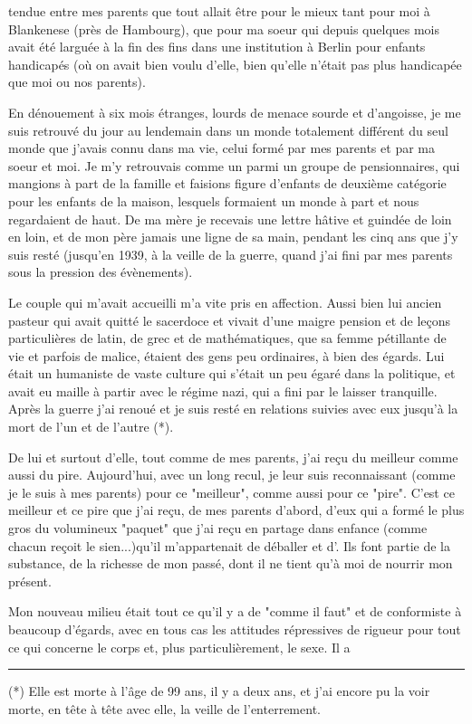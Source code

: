 

tendue entre mes parents que tout allait être pour le mieux tant pour moi à Blankenese (près de Hambourg), que pour ma soeur qui depuis quelques mois avait été larguée à la fin des fins dans une institution à Berlin pour enfants handicapés (où on avait bien voulu d'elle, bien qu'elle n'était pas plus handicapée que moi ou nos parents).

En dénouement à six mois étranges, lourds de menace sourde et d'angoisse, je me suis retrouvé du jour au lendemain dans un monde totalement différent du seul monde que j'avais connu dans ma vie, celui formé par mes parents et par ma soeur et moi. Je m'y retrouvais comme un parmi un groupe de pensionnaires, qui mangions à part de la famille et faisions figure d'enfants de deuxième catégorie pour les enfants de la maison, lesquels formaient un monde à part et nous regardaient de haut. De ma mère je recevais une lettre hâtive et guindée de loin en loin, et de mon père jamais une ligne de sa main, pendant les cinq ans que j'y suis resté (jusqu'en 1939, à la veille de la guerre, quand j'ai fini par  mes parents sous la pression des évènements).

Le couple qui m'avait accueilli m'a vite pris en affection. Aussi bien lui ancien pasteur qui avait quitté le sacerdoce et vivait d'une maigre pension et de leçons particulières de latin, de grec et de mathématiques, que sa femme pétillante de vie et parfois de malice, étaient des gens peu ordinaires,  à bien des égards. Lui était un humaniste de vaste culture qui s'était un peu égaré dans la politique, et avait eu maille à partir avec le régime nazi, qui a fini par le laisser tranquille. Après la guerre j'ai renoué et je suis resté en relations suivies avec eux jusqu'à la mort de l'un et de l'autre (*).

De lui et surtout d'elle, tout comme de mes parents, j'ai reçu du meilleur comme aussi du pire. Aujourd'hui, avec un long recul, je leur suis reconnaissant (comme je le suis à mes parents) pour ce "meilleur", comme aussi pour ce "pire". C'est ce meilleur et ce pire que j'ai reçu, de mes parents d'abord, d'eux  qui a formé le plus gros du volumineux "paquet" que j'ai reçu en partage dans  enfance (comme chacun reçoit le sien...)\handwritten{\unsure{,}}\unsure{,}qu'il m'appartenait de déballer et d'. Ils font partie de la substance, de la richesse de mon passé, dont il ne tient qu'à moi de nourrir mon présent.

Mon nouveau milieu était tout ce qu'il y a de "comme il faut" et de conformiste à beaucoup d'égards, avec en tous cas les attitudes répressives de rigueur pour tout ce qui concerne le corps et, plus particulièrement, le sexe. Il a 

\noindent\rule{5em}{0.4pt}\par
(*) Elle est morte à l'âge de 99 ans, il y a deux ans, et j'ai encore pu la voir morte, en tête à tête avec elle, la veille de l'enterrement.

